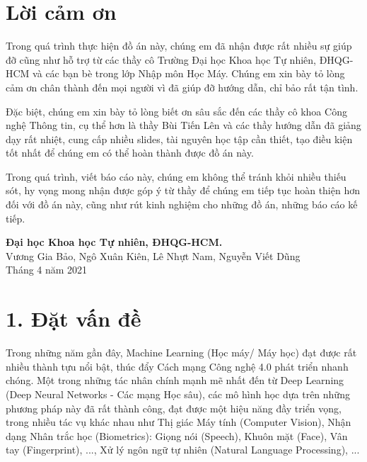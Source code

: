 \documentclass{article}
\begin{document}
	\section*{Lời cảm ơn}
	\vspace{1.0in}
	\begingroup
	\setlength{\parindent}{0pt}
	\qquad Trong quá trình thực hiện đồ án này, chúng em đã nhận được rất nhiều sự giúp đỡ cũng như hỗ trợ từ các thầy cô Trường Đại học Khoa học Tự nhiên, ĐHQG-HCM và các bạn bè trong lớp Nhập môn Học Máy. Chúng em xin bày tỏ lòng cảm ơn chân thành đến mọi người vì đã giúp đỡ hướng dẫn, chỉ bảo rất tận tình.
	
	\qquad Đặc biệt, chúng em xin bày tỏ lòng biết ơn sâu sắc đến các thầy cô khoa Công nghệ Thông tin, cụ thể hơn là thầy Bùi Tiến Lên và các thầy hướng dẫn đã giảng dạy rất nhiệt, cung cấp nhiều slides, tài nguyên học tập cần thiết, tạo điều kiện tốt nhất để chúng em có thể hoàn thành được đồ án này.
		
	\qquad Trong quá trình, viết báo cáo này, chúng em không thể tránh khỏi nhiều thiếu sót, hy vọng mong nhận được góp ý từ thầy để chúng em tiếp tục hoàn thiện hơn đối với đồ án này, cũng như rút kinh nghiệm cho những đồ án, những báo cáo kế tiếp.
	
	\vspace{1.0in}
	\textbf{Đại học Khoa học Tự nhiên, ĐHQG-HCM.}\\
	Vương Gia Bảo, Ngô Xuân Kiên, Lê Nhựt Nam, Nguyễn Viết Dũng\\
	Tháng 4 năm 2021\\
	\endgroup
	
	\newpage
	\tableofcontents
	\newpage
	\setcounter{secnumdepth}{0}
	
	\section{1. Đặt vấn đề}
	
	Trong những năm gần đây, Machine Learning (Học máy/ Máy học) đạt được rất nhiều thành tựu nổi bật, thúc đẩy Cách mạng Công nghệ 4.0 phát triển nhanh chóng. Một trong những tác nhân chính mạnh mẽ nhất đến từ Deep Learning (Deep Neural Networks - Các mạng Học sâu), các mô hình học dựa trên những phương pháp này đã rất thành công, đạt được một hiệu năng đầy triển vọng, trong nhiều tác vụ khác nhau như Thị giác Máy tính (Computer Vision), Nhận dạng Nhân trắc học (Biometrics): Giọng nói (Speech), Khuôn mặt (Face), Vân tay (Fingerprint), ..., Xử lý ngôn ngữ tự nhiên (Natural Language Processing), ...
	
\end{document}
